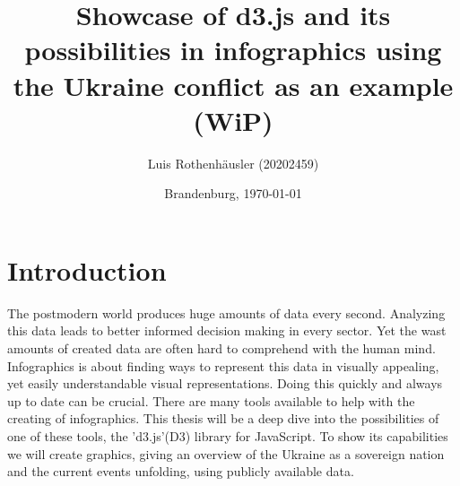 \documentclass[
a4paper,     %
12pt         %
]{scrartcl}  %
\title{Showcase of d3.js and its possibilities in infographics using the Ukraine conflict as an example (WiP)}
\author{Luis Rothenh\"ausler (20202459)}
\date{Brandenburg, \today{}}
\begin{document}

 \maketitle

\tableofcontents





\newpage

\section{Introduction}
The postmodern world produces huge amounts of data every second. Analyzing this data leads to better informed decision making in every sector. Yet the wast amounts of created data are often hard to comprehend with the human mind. Infographics is about finding ways to represent this data in visually appealing, yet easily understandable visual representations. Doing this quickly and always up to date can be crucial. There are many tools available to help with the creating of infographics. This thesis will be a deep dive into the possibilities of one of these tools, the 'd3.js'(D3) library for JavaScript. To show its capabilities we will create graphics, giving an overview of the Ukraine as a sovereign nation and the current events unfolding, using publicly available data.
\end{document}
